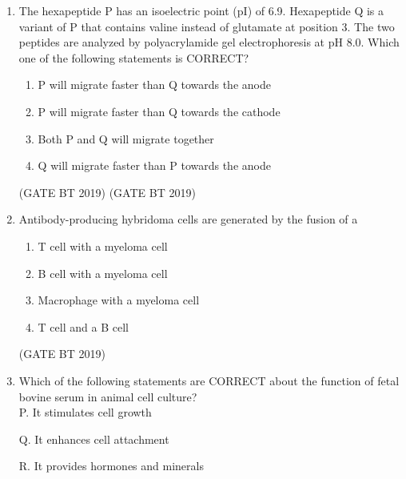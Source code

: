 \documentclass[journal,12pt,onecolumn]{IEEEtran}
\begin{document}
\begin{enumerate}
\begin{multicols}{2}
\begin{enumerate}
\item P-4, Q-3, R-1
\item P-2, Q-1, R-3
\item P-1, Q-2, R-4
\item P-3, Q-2, R-4
\end{enumerate}
\end{multicols}\hfill(GATE BT 2019)

\item The hexapeptide P has an isoelectric point (pI) of 6.9. Hexapeptide Q is a variant of P that contains valine instead of glutamate at position 3. The two peptides are analyzed by polyacrylamide gel electrophoresis at pH 8.0. Which one of the following statements is CORRECT?
\begin{enumerate}
\item P will migrate faster than Q towards the anode
\item P will migrate faster than Q towards the cathode
\item Both P and Q will migrate together
\item Q will migrate faster than P towards the anode
\end{enumerate}\hfill(GATE BT 2019)
\hfill(GATE BT 2019)

\item Antibody-producing hybridoma cells are generated by the fusion of a

\begin{multicols}{2}
\begin{enumerate}
\item T cell with a myeloma cell
\item B cell with a myeloma cell
\item Macrophage with a myeloma cell
\item T cell and a B cell
\end{enumerate}
\end{multicols}\hfill(GATE BT 2019)

\item Which of the following statements are CORRECT about the function of fetal bovine serum in animal cell culture? \\[6pt]

P. It stimulates cell growth 

Q. It enhances cell attachment 

R. It provides hormones and minerals 


\end{enumerate}
\end{document}
